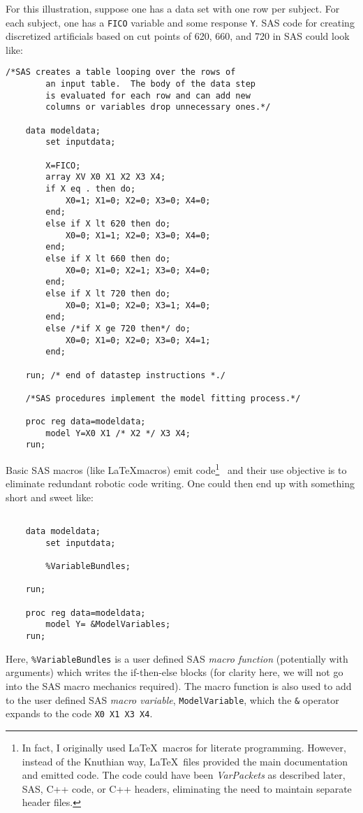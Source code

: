 \documentclass[10pt]{article}
\begin{document}
For this illustration, suppose one has a data set with one row per subject. For each subject, one has a \verb+FICO+ variable and some 
response \verb+Y+.  SAS code for  creating discretized artificials based on cut points of 620, 660, and 720 in SAS could look like:
\begin{Verbatim}[fontsize=\small,baselinestretch=0.75,formatcom=\color{red}]
    /*SAS creates a table looping over the rows of 
        an input table.  The body of the data step 
        is evaluated for each row and can add new 
        columns or variables drop unnecessary ones.*/

    data modeldata;
        set inputdata; 

        X=FICO;
        array XV X0 X1 X2 X3 X4;
        if X eq . then do; 
            X0=1; X1=0; X2=0; X3=0; X4=0; 
        end;
        else if X lt 620 then do;
            X0=0; X1=1; X2=0; X3=0; X4=0; 
        end;
        else if X lt 660 then do;
            X0=0; X1=0; X2=1; X3=0; X4=0; 
        end;
        else if X lt 720 then do;
            X0=0; X1=0; X2=0; X3=1; X4=0; 
        end;
        else /*if X ge 720 then*/ do;
            X0=0; X1=0; X2=0; X3=0; X4=1; 
        end;

    run; /* end of datastep instructions *./

    /*SAS procedures implement the model fitting process.*/

    proc reg data=modeldata;
        model Y=X0 X1 /* X2 */ X3 X4;
    run;
\end{Verbatim}
Basic SAS macros (like \LaTeX macros) emit code\ifcommentary\footnote{In fact,
I originally used \LaTeX\ macros for literate programming.  However, instead of 
the Knuthian way, \LaTeX\ files provided the main documentation and emitted 
code.  The code could have been {\em VarPackets} as described later, SAS, 
C++ code, or C++ headers, eliminating the need to maintain separate header files.}\fi
~and their use objective 
is to eliminate redundant robotic code writing. One could then end up with something 
short and sweet like:
\begin{Verbatim}[fontsize=\small,baselinestretch=0.75,formatcom=\color{red}]

    data modeldata;
        set inputdata;

        %VariableBundles;  

    run;

    proc reg data=modeldata;
        model Y= &ModelVariables;  
    run;

\end{Verbatim}
Here, \verb+%VariableBundles+ is a user defined SAS {\em macro function} (potentially with arguments) which writes the if-then-else blocks 
(for clarity here, we will not go into the SAS macro mechanics required).
The macro function is also used to add to the user defined SAS {\em macro variable}, \verb+ModelVariable+, which the \verb+&+ operator expands to the
code \verb+X0 X1 X3 X4+.
\end{document}
